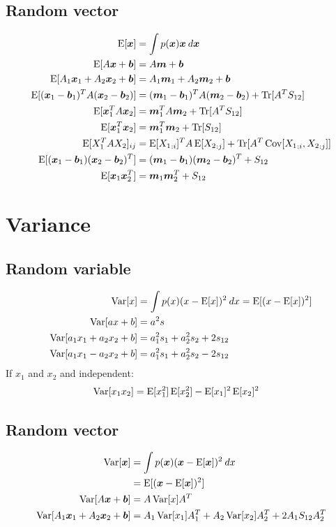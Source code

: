 \documentclass[a4paper]{article}
\begin{document}
\subsection{Random vector}
\begin{align*}
  \Exp{\bs{x}} &= \int p(\bs{x}) \bs{x} \: d\bs{x} \\
  \Exp{A \bs{x} + \bs{b}} &= A \bs{m} + \bs{b} \\
  \Exp{A_1 \bs{x}_1 + A_2 \bs{x}_2 + \bs{b}} &= A_1 \bs{m}_1 + A_2 \bs{m}_2 + \bs{b} \\
  \Exp{(\bs{x}_1 - \bs{b}_1)^T A (\bs{x}_2 - \bs{b}_2)} &= (\bs{m}_1 - \bs{b}_1)^T A (\bs{m}_2 - \bs{b}_2) + \Tr{A^T S_{12}} \\
  \Exp{\bs{x}_1^T A \bs{x}_2} &= \bs{m}_1^T A \bs{m}_2 + \Tr{A^T S_{12}} \\
  \Exp{\bs{x}_1^T \bs{x}_2} &= \bs{m}_1^T \bs{m}_2 + \Tr{S_{12}} \\
  \Exp{X_1^T A X_2}_{ij} &= \Exp{{X_1}_{:i}}^T A \Exp{{X_2}_{:j}} + \Tr{A^T \Cov{{X_1}_{:i}, {X_2}_{:j}}} \\
  \Exp{(\bs{x}_1 - \bs{b}_1) (\bs{x}_2 - \bs{b}_2)^T} &= (\bs{m}_1 - \bs{b}_1) (\bs{m}_2 - \bs{b}_2)^T + S_{12} \\
  \Exp{\bs{x}_1 \bs{x}_2^T} &= \bs{m}_1 \bs{m}_2^T + S_{12} \\
\end{align*}
\newpage

\section{Variance}
\subsection{Random variable}
\begin{align*}
  \Var{x} &= \int p(x) (x-\Exp{x})^2 \: dx = \Exp{(x-\Exp{x})^2} \\
  \Var{ax + b} &= a^2 s \\
  \Var{a_1 x_1 + a_2 x_2 + b} &= a_1^2 s_1 + a_2^2 s_2 + 2 s_{12} \\
  \Var{a_1 x_1 - a_2 x_2 + b} &= a_1^2 s_1 + a_2^2 s_2 - 2 s_{12} \\
\end{align*}
If $x_1$ and $x_2$ and independent:
\begin{align*}
  \Var{x_1 x_2} &= \Exp{x_1^2} \Exp{x_2^2} - \Exp{x_1}^2 \Exp{x_2}^2
\end{align*}

\subsection{Random vector}
\begin{align*}
  \Var{\bs{x}} &= \int p(\bs{x}) (\bs{x}-\Exp{\bs{x}})^2 \: dx \\
               &= \Exp{(\bs{x}-\Exp{\bs{x}})^2} \\
  \Var{A \bs{x} + \bs{b}} &= A \Var{x} A^T \\
  \Var{A_1 \bs{x}_1 + A_2 \bs{x}_2 + \bs{b}} &= A_1 \Var{x_1} A_1^T + A_2 \Var{x_2} A_2^T + 2 A_1 S_{12} A_2^T \\
\end{align*}
\end{document}
